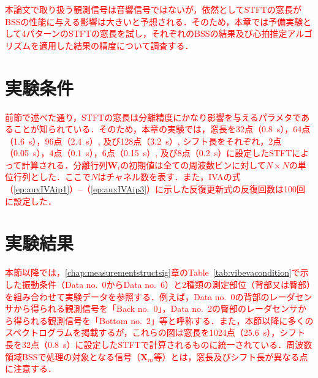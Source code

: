 \textcolor{red}{本論文で取り扱う観測信号は音響信号ではないが，依然としてSTFTの窓長がBSSの性能に与える影響は大きいと予想される．そのため，本章では予備実験として4パターンのSTFTの窓長を試し，それぞれのBSSの結果及び心拍推定アルゴリズムを適用した結果の精度について調査する．}

\section{実験条件}
\label{sec:conv:expcondition4}
\textcolor{red}{前節で述べた通り，STFTの窓長は分離精度にかなり影響を与えるパラメタであることが知られている．そのため，本章の実験では，窓長を32点（0.8~s），64点（1.6~s），96点（2.4~s）, 及び128点（3.2~s）, シフト長をそれぞれ，2点（0.05~s），4点（0.1~s），6点（0.15~s）, 及び8点（0.2~s）に設定したSTFTによって計算される．分離行列$\bm{W}_{i}$の初期値は全ての周波数ビンに対して$N\times N$の単位行列とした．ここで$N$はチャネル数を表す．また，IVAの式（\ref{ep:auxIVAip1}）--（\ref{ep:auxIVAip3}）に示した反復更新式の反復回数は100回に設定した．}

\section{実験結果}
\label{sec:conv:expresult4}

\textcolor{red}{本節以降では，\ref{chap:measurementstructsig}章のTable~\ref{tab:vibevacondition}で示した振動条件（Data no.~0からData no.~6）と2種類の測定部位（背部又は臀部）を組み合わせて実験データを参照する．例えば，Data no.~0の背部のレーダセンサから得られる観測信号を「Back no.~0」，Data no.~2の臀部のレーダセンサから得られる観測信号を「Bottom no.~2」等と呼称する．また，本節以降に多くのスペクトログラムを掲載するが，これらの図は窓長を1024点（25.6~s），シフト長を32点（0.8~s）に設定したSTFTで計算されるものに統一されている．周波数領域BSSで処理の対象となる信号（$\bm{X}_m$等）とは，窓長及びシフト長が異なる点に注意する．}

